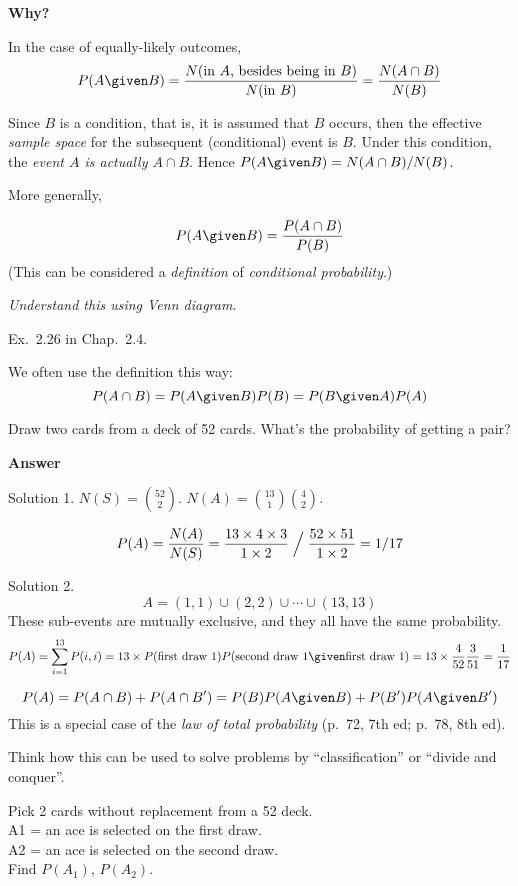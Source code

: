 \documentclass[12pt]{article}
\begin{document}
\textbf{Why?}

In the case of equally-likely outcomes,
\[
P(A \given B)
= \frac{N(\text{in $A$, besides being in $B$})}{N(\text{in $B$})}
= \frac{N(A \cap B)}{N(B)}
\]

Since $B$ is a condition, that is, it is assumed that $B$ occurs,
then the effective \emph{sample space} for the subsequent (conditional) event
is $B$. Under this condition,
the \emph{event $A$ is actually $A \cap B$}.
Hence
$P(A \given B) = N(A \cap B) / N(B)$.

More generally,

\[ P(A \given B) = \frac{P(A \cap B)}{P(B)} \]
(This can be considered a \emph{definition} of \emph{conditional
probability}.)

\emph{Understand this using Venn diagram}.

\example
Ex.~2.26 in Chap.~2.4.

\alert
We often use the definition this way:
\[
P(A \cap B) = P(A \given B) P(B) = P(B \given A) P(A)
\]

\example
Draw two cards from a deck of 52 cards.
What's the probability of getting a pair?

\textbf{Answer}

Solution 1.
$N(S) = {52 \choose 2}$.
$N(A) = {13 \choose 1} {4 \choose 2}$.

\[
P(A)
= \frac{N(A)}{N(S)}
= \frac{13 \times 4 \times 3}{1 \times 2} \Bigm/
  \frac{52 \times 51}{1 \times 2}
= 1/17
\]

Solution 2.
\[
A = (1,1) \cup (2,2) \cup \dotsb \cup (13,13)
\]
These sub-events are mutually exclusive,
and they all have the same probability.
\[
P(A)
= \sum_{i=1}^{13} P(i,i)
= 13\times P(\text{first draw 1})
    P(\text{second draw 1} \given \text{first draw 1})
= 13 \times \frac{4}{52} \frac{3}{51}
= \frac{1}{17}
\]


\alert
\[ P(A) = P(A \cap B) + P(A \cap B') = P(B) P(A \given B) + P(B') P(A
\given B')
\]
This is a special case of the \emph{law of total probability}
(p.~72, 7th ed; p.~78, 8th ed).

Think how this can be used to solve problems by ``classification'' or
``divide and conquer''.

\example Pick 2 cards without replacement from a 52 deck.\\
A1 = an ace is selected on the first draw.\\
A2 = an ace is selected on the second draw.\\
Find $P(A_1)$, $P(A_2)$.
\end{document}
